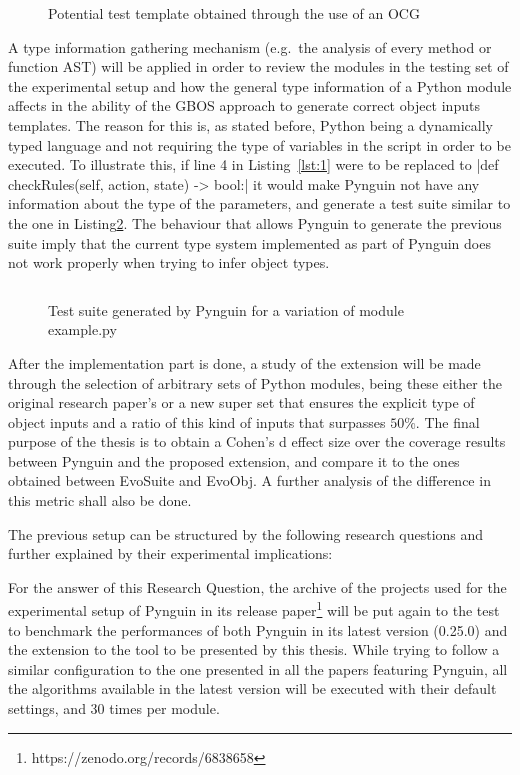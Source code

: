 \documentclass[%
  chapterprefix=false,%
  open=right,%
  twoside=true,%
  paper=a4,%
  logofile={Figures/logo.png},%
  thesistype=master,%
  UKenglish,%
]{se2thesis}
\begin{document}
\begin{figure}
  \inputminted[linenos]{python}{Figures/template.py}
  \caption{Potential test template obtained through the use of an OCG\label{lst:4}}
\end{figure}

A type information gathering mechanism (e.g.~the analysis of every method or function AST) will be applied in order to review the modules in the testing set of the experimental setup and how the general type information of a Python module affects in the ability of the GBOS approach to generate correct object inputs templates.
The reason for this is, as stated before, Python being a dynamically typed language and not requiring the type of variables in the script in order to be executed.
To illustrate this, if line 4 in Listing~\ref{lst:1} were to be replaced to |def checkRules(self, action, state) -> bool:| it would make Pynguin not have any information about the type of the parameters, and generate a test suite similar to the one in Listing\ref{lst:5}.
The behaviour that allows Pynguin to generate the previous suite imply that the current type system implemented as part of Pynguin does not work properly when trying to infer object types.

\begin{figure}
  \inputminted[linenos]{python}{Figures/test2.py}
  \caption{Test suite generated by Pynguin for a variation of module example.py\label{lst:5}}
\end{figure}

After the implementation part is done, a study of the extension will be made through the selection of arbitrary sets of Python modules, being these either the original research paper's or a new super set that ensures the explicit type of object inputs and a ratio of this kind of inputs that surpasses $50\%$.
The final purpose of the thesis is to obtain a Cohen's d effect size over the coverage results between Pynguin and the proposed extension, and compare it to the ones obtained between EvoSuite and EvoObj.
A further analysis of the difference in this metric shall also be done.

The previous setup can be structured by the following research questions and further explained by their experimental implications:


For the answer of this Research Question, the archive of the projects used for the experimental setup of Pynguin in its release paper\footnote{https://zenodo.org/records/6838658} will be put again to the test to benchmark the performances of both Pynguin in its latest version (0.25.0) and the extension to the tool to be presented by this thesis.
While trying to follow a similar configuration to the one presented in all the papers featuring Pynguin, all the algorithms available in the latest version will be executed with their default settings, and 30 times per module.
\end{document}
